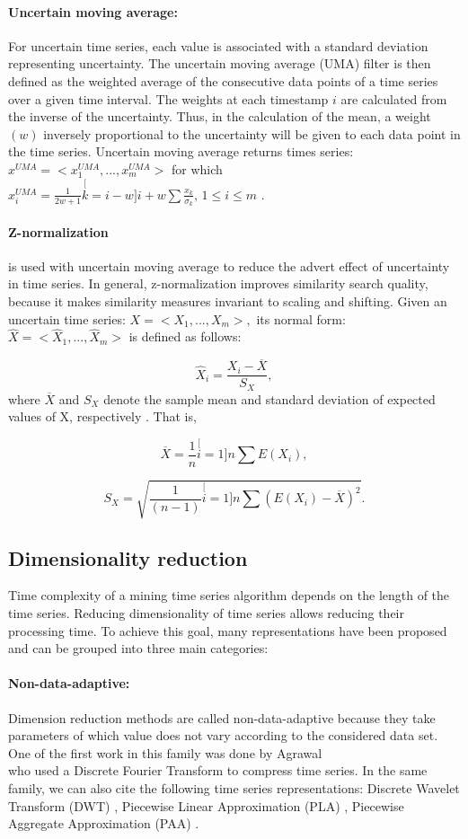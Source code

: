 \paragraph{Uncertain moving average:}   For uncertain time series, each value is associated with a standard deviation representing uncertainty. The uncertain moving average (UMA) filter is then defined as the weighted average of the consecutive data points of a time series over a given time interval. The weights at each timestamp $i$ are calculated from the inverse of the uncertainty. Thus, in the calculation of the mean, a weight $(w)$ inversely proportional to the uncertainty will be given to each data point in the time series. Uncertain moving average returns times series: $x^{UMA}=<x_{1}^{UMA},...,x_{m}^{UMA}>$ for which $x_{i}^{UMA}=\frac{1}{2w+1}\stackrel[k=i-w]{i+w}{\sum}\frac{x_{k}}{\sigma_{k}},\,1\leq i\leq m$ \cite{Orang2015}.

\paragraph{Z-normalization} is used with uncertain moving average to reduce the advert effect of uncertainty in time series. In general, z-normalization improves similarity search quality, because it makes similarity measures invariant to scaling and shifting. Given an uncertain time series: $X=<X_{1},...,X_{m}>,$ its normal form: $\hat{X}=<\hat{X}_{1},...,\hat{X}_{m}>$ is defined as follows: 

\[
\ensuremath{\hat{X}_{i}}=\frac{X_{i}-\overline{X}}{S_{X}},
\]
where $\overline{X}$ and $S_{X}$ denote the sample mean and standard deviation of expected values of X, respectively \cite{Orang2015}. That is,

\[
\overline{X}=\frac{1}{n}\stackrel[i=1]{n}{\sum}E(X_{i}),
\]

\[
S_{X}=\sqrt{\frac{1}{(n-1)}\stackrel[i=1]{n}{\sum}(E(X_{i})-\overline{X})^{2}}.
\]

\subsection{Dimensionality reduction}
Time complexity of a mining time series algorithm depends on the length of the time series. Reducing dimensionality of time series allows reducing their processing time. To achieve this goal, many representations have been proposed and can be grouped into three main categories: 

\paragraph{Non-data-adaptive:}Dimension reduction methods are called non-data-adaptive because they take parameters of which value does not vary according to the considered data set. One of the first work in this family was done by Agrawal \\ \cite{Agrawal1993} who used a Discrete Fourier Transform to compress time series. In the same family, we can also cite the following time series representations:  Discrete Wavelet Transform (DWT) \cite{chan1999efficient}, Piecewise Linear Approximation (PLA) \cite{eriksson2004piecewise}, Piecewise Aggregate Approximation (PAA) \cite{Keogh2001a}. 


